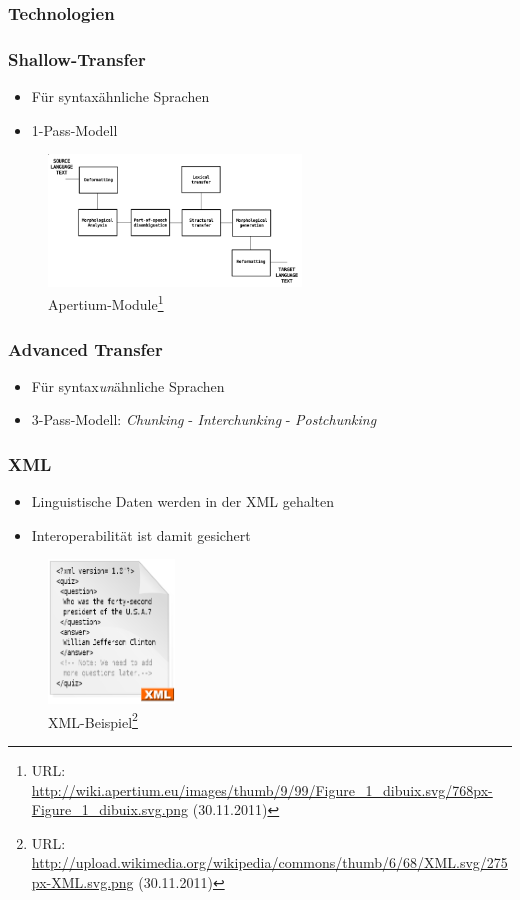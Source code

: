 \documentclass{beamer}
\begin{document}
\subsubsection{Technologien}
\begin{frame}
\frametitle{Shallow-Transfer}
\begin{itemize}
\item Für syntaxähnliche Sprachen
\item 1-Pass-Modell
\end{itemize}
\begin{figure}
  \includegraphics[width=0.60\textwidth]{graphics/apertiummodule}
  \caption{Apertium-Module\footnote{URL: \url{http://wiki.apertium.eu/images/thumb/9/99/Figure_1_dibuix.svg/768px-Figure_1_dibuix.svg.png} (30.11.2011)}}
  \end{figure}
\end{frame}
\begin{frame}
\frametitle{Advanced Transfer}
\begin{itemize}
\item Für syntax\emph{un}ähnliche Sprachen
\item 3-Pass-Modell: \emph{Chunking} - \emph{Interchunking} - \emph{Postchunking}
\end{itemize}
\end{frame}
\begin{frame}
\frametitle{XML}
\begin{itemize}
\item Linguistische Daten werden in der XML gehalten
\item Interoperabilität ist damit gesichert
\end{itemize}
\begin{figure}
  \includegraphics[width=0.30\textwidth]{graphics/xml}
  \caption{XML-Beispiel\footnote{URL: \url{http://upload.wikimedia.org/wikipedia/commons/thumb/6/68/XML.svg/275px-XML.svg.png} (30.11.2011)}}
  \end{figure}
\end{frame}
\end{document}
